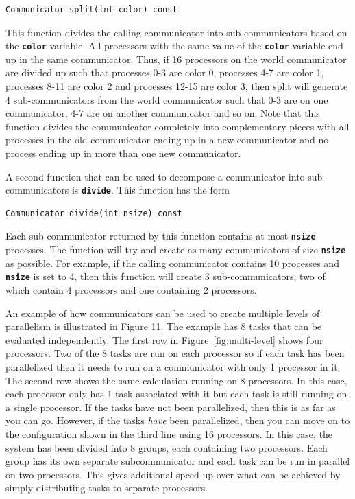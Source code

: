 {
\color{red}
\begin{Verbatim}[fontseries=b]
Communicator split(int color) const
\end{Verbatim}
}

This function divides the calling communicator into sub-communicators based on the \texttt{\textbf{color}} variable. All processors with the same value of the \texttt{\textbf{color}} variable end up in the same communicator. Thus, if 16 processors on the world communicator are divided up such that processes 0-3 are color 0, processes 4-7 are color 1, processes 8-11 are color 2 and processes 12-15 are color 3, then split will generate 4 sub-communicators from the world communicator such that 0-3 are on one communicator, 4-7 are on another communicator and so on. Note that this function divides the communicator completely into complementary pieces with all processes in the old communicator ending up in a new communicator and no process ending up in more than one new communicator.

A second function that can be used to decompose a communicator into sub-communicators is \texttt{\textbf{divide}}. This function has the form

{
\color{red}
\begin{Verbatim}[fontseries=b]
Communicator divide(int nsize) const
\end{Verbatim}
}

Each sub-communicator returned by this function contains at most \texttt{\textbf{nsize}} processes. The function will try and create as many communicators of size \texttt{\textbf{nsize}} as possible. For example, if the calling communicator contains 10 processes and \texttt{\textbf{nsize}} is set to 4, then this function will create 3 sub-communicators, two of which contain 4 processors and one containing 2 processors.

An example of how communicators can be used to create multiple levels of
parallelism is illustrated in Figure 11. The example has 8 tasks that can be
evaluated independently. The first row in Figure~\ref{fig:multi-level} shows four processors. Two of the 8 tasks are run on each processor so if each task has been parallelized then it needs to run on a communicator with only 1 processor in it. The second row shows the same calculation running on 8 processors. In this case, each processor only has 1 task associated with it but each task is still running on a single processor. If the tasks have not been parallelized, then this is as far as you can go. However, if the tasks \textit{have} been parallelized, then you can move on to the configuration shown in the third line using 16 processors. In this case, the system has been divided into 8 groups, each containing two processors. Each group has its own separate subcommunicator and each task can be run in parallel on two processors. This gives additional speed-up over what can be achieved by simply distributing tasks to separate processors.


